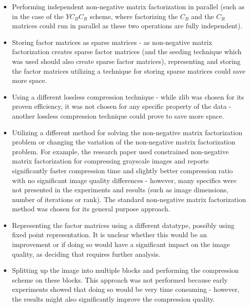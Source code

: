 \documentclass[thesis=M,english]{FITthesis}[2012/10/20]
\begin{document}
\begin{itemize}
  \item Performing independent non-negative matrix factorization in parallel
  (such as in the case of the $YC_BC_R$ scheme, where factorizing the $C_B$
  and the $C_R$ matrices could run in parallel as these two operations are
  fully independent).
  \item Storing factor matrices as sparse matrices - as non-negative matrix
  factorization creates sparse factor matrices (and the seeding technique
  which was used should also create sparse factor matrices), representing
  and storing the factor matrices utilizing a technique for storing sparse
  matrices could save more space.
  \item Using a different lossless compression technique - while zlib was
  chosen for its proven efficiency, it was not chosen for any specific property
  of the data - another lossless compression technique could prove to save
  more space.
  \item Utilizing a different method for solving the non-negative matrix factorization
  problem or changing the variation of the non-negative matrix factorization problem.
  For example, the research paper \cite{imgcnmf} used constrained non-negative matrix factorization for
  compressing grayscale images and reports significantly faster compression time and slightly
  better compression ratio with no significant image quality differences - however, many specifics
  were not presented in the experiments and results (such as image dimensions, number
  of iterations or rank). The standard non-negative matrix factorization method was
  chosen for its general purpose approach.
  \item Representing the factor matrices using a different datatype, possibly using fixed point
  representation. It is unclear whether this would be an improvement or if doing so would
  have a significant impact on the image quality, as deciding that requires further analysis.
  \item Splitting up the image into multiple blocks and performing the compression scheme on these
  blocks. This approach was not performed because early experiments showed that doing so would be very
  time consuming - however, the results might also significantly improve the compression quality.
\end{itemize}


\end{document}
